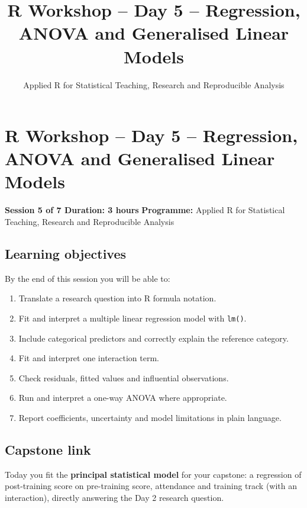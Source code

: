 \documentclass[11pt]{article}
\title{R Workshop -- Day 5 -- Regression, ANOVA and Generalised Linear Models}
\author{Applied R for Statistical Teaching, Research and Reproducible Analysis}
\date{}
\providecommand{\tightlist}{%
  \setlength{\itemsep}{0pt}\setlength{\parskip}{0pt}}
\begin{document}
\maketitle
\tableofcontents
\newpage
\hypertarget{r-workshop-day-5-regression-anova-and-generalised-linear-models}{%
\section{R Workshop -- Day 5 -- Regression, ANOVA and Generalised Linear
Models}\label{r-workshop-day-5-regression-anova-and-generalised-linear-models}}

\textbf{Session 5 of 7 \textbar{} Duration: 3 hours} \textbf{Programme:}
Applied R for Statistical Teaching, Research and Reproducible Analysis

\hypertarget{learning-objectives}{%
\subsection{Learning objectives}\label{learning-objectives}}

By the end of this session you will be able to:

\begin{enumerate}
\def\labelenumi{\arabic{enumi}.}
\tightlist
\item
  Translate a research question into R formula notation.
\item
  Fit and interpret a multiple linear regression model with
  \texttt{lm()}.
\item
  Include categorical predictors and correctly explain the reference
  category.
\item
  Fit and interpret one interaction term.
\item
  Check residuals, fitted values and influential observations.
\item
  Run and interpret a one-way ANOVA where appropriate.
\item
  Report coefficients, uncertainty and model limitations in plain
  language.
\end{enumerate}

\hypertarget{capstone-link}{%
\subsection{Capstone link}\label{capstone-link}}

Today you fit the \textbf{principal statistical model} for your
capstone: a regression of post-training score on pre-training score,
attendance and training track (with an interaction), directly answering
the Day 2 research question.
\end{document}
